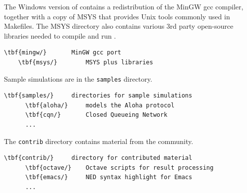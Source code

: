 The Windows version of {\opp} contains a redistribution of the MinGW
gcc compiler, together with a copy of MSYS that provides Unix tools
commonly used in Makefiles. The MSYS directory also contains various
3rd party open-source libraries needed to compile and run {\opp}.

\begin{Verbatim}[commandchars=\\\{\}]
    \tbf{mingw/}       MinGW gcc port
    \tbf{msys/}        MSYS plus libraries
\end{Verbatim}

Sample simulations are in the \texttt{samples} directory.

\begin{Verbatim}[commandchars=\\\{\}]
    \tbf{samples/}     directories for sample simulations
      \tbf{aloha/}     models the Aloha protocol
      \tbf{cqn/}       Closed Queueing Network
      ...
\end{Verbatim}

The \texttt{contrib} directory contains material from the {\opp} community.

\begin{Verbatim}[commandchars=\\\{\}]
    \tbf{contrib/}     directory for contributed material
      \tbf{octave/}    Octave scripts for result processing
      \tbf{emacs/}     NED syntax highlight for Emacs
      ...
\end{Verbatim}



